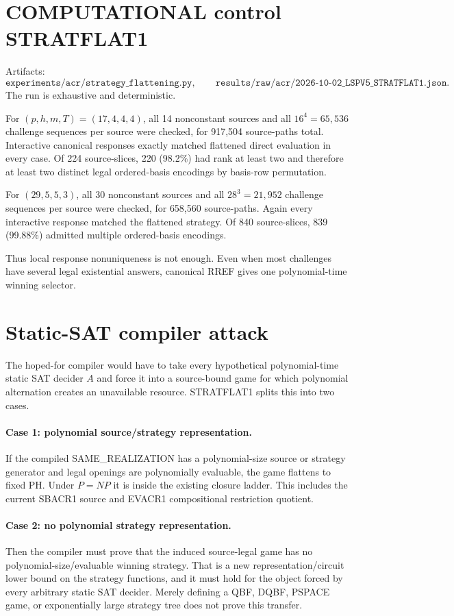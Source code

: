 \documentclass[11pt]{article}
\begin{document}
\section*{COMPUTATIONAL control STRATFLAT1}
Artifacts:
\[
\texttt{experiments/acr/strategy\_flattening.py},\qquad\texttt{results/raw/acr/2026-10-02\_LSPV5\_STRATFLAT1.json}.
\]
The run is exhaustive and deterministic.

For \((p,h,m,T)=(17,4,4,4)\), all 14 nonconstant sources and all \(16^4=65{,}536\) challenge sequences per source were checked, for 917,504 source-paths total. Interactive canonical responses exactly matched flattened direct evaluation in every case. Of 224 source-slices, 220 (98.2\%) had rank at least two and therefore at least two distinct legal ordered-basis encodings by basis-row permutation.

For \((29,5,5,3)\), all 30 nonconstant sources and all \(28^3=21{,}952\) challenge sequences per source were checked, for 658,560 source-paths. Again every interactive response matched the flattened strategy. Of 840 source-slices, 839 (99.88\%) admitted multiple ordered-basis encodings.

Thus local response nonuniqueness is not enough. Even when most challenges have several legal existential answers, canonical RREF gives one polynomial-time winning selector.

\section*{Static-SAT compiler attack}
The hoped-for compiler would have to take every hypothetical polynomial-time static SAT decider \(A\) and force it into a source-bound game for which polynomial alternation creates an unavailable resource. STRATFLAT1 splits this into two cases.

\paragraph{Case 1: polynomial source/strategy representation.}
If the compiled SAME\_REALIZATION has a polynomial-size source or strategy generator and legal openings are polynomially evaluable, the game flattens to fixed PH. Under \(P=NP\) it is inside the existing closure ladder. This includes the current SBACR1 source and EVACR1 compositional restriction quotient.

\paragraph{Case 2: no polynomial strategy representation.}
Then the compiler must prove that the induced source-legal game has no polynomial-size/evaluable winning strategy. That is a new representation/circuit lower bound on the strategy functions, and it must hold for the object forced by every arbitrary static SAT decider. Merely defining a QBF, DQBF, PSPACE game, or exponentially large strategy tree does not prove this transfer.
\end{document}
